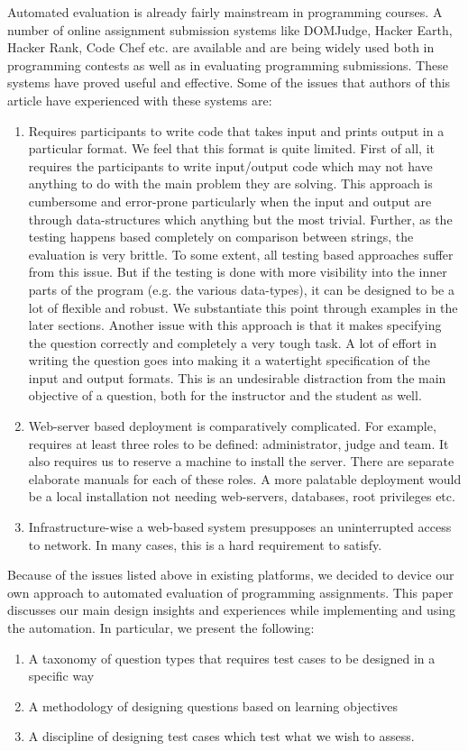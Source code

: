 \documentclass[sigconf]{acmart}
\begin{document}
Automated evaluation is already fairly mainstream in programming courses. A number of online assignment submission systems like DOMJudge, Hacker Earth, Hacker Rank, Code Chef etc. are available and are being widely used both in programming contests as well as in evaluating programming submissions. These systems have proved useful and effective. Some of the issues that authors of this article have experienced with these systems are:
\begin{enumerate}
\item Requires participants to write code that takes input and prints output in a particular format. We feel that this format is quite limited. First of all, it requires the participants to write input/output code which may not have anything to do with the main problem they are solving. This approach is cumbersome and error-prone particularly when the input and output are through data-structures which anything but the most trivial. Further, as the testing happens based completely on comparison between strings, the evaluation is very brittle. To some extent, all testing based approaches suffer from this issue. But if the testing is done with more visibility into the inner parts of the program (e.g. the various data-types), it can be designed to be a lot of flexible and robust. We substantiate this point through examples in the later sections. Another issue with this approach is that it makes specifying the question correctly and completely a very tough task. A lot of effort in writing the question goes into making it a watertight specification of the input and output formats. This is an undesirable distraction from the main objective of a question, both for the instructor and the student as well.

\item Web-server based deployment is comparatively complicated. For example, \cite{domjudge} requires at least three roles to be defined: administrator, judge and team. It also requires us to reserve a machine to install the server. There are separate elaborate manuals for each of these roles. A more palatable deployment would be a local installation not needing web-servers, databases, root privileges etc.

\item Infrastructure-wise a web-based system presupposes an uninterrupted access to network. In many cases, this is a hard requirement to satisfy.
\end{enumerate}

Because of the issues listed above in existing platforms, we decided to device our own approach to automated evaluation of programming assignments. This paper discusses our main design insights and experiences while implementing and using the automation. In particular, we present the following:
\begin{enumerate}
\item A taxonomy of question types that requires test cases to be designed in a specific way
\item A methodology of designing questions based on learning objectives
\item A discipline of designing test cases which test what we wish to assess.
\end{enumerate}
\end{document}
